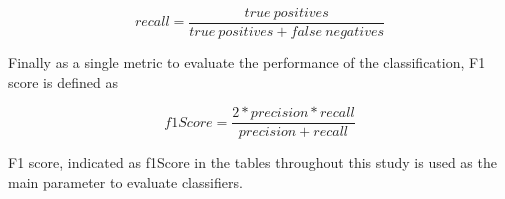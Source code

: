 \begin{equation}
recall = \frac{true \ positives}{true \ positives + false \ negatives}
\end{equation}

Finally as a single metric to evaluate the performance of the classification, F1 score is defined as

\begin{equation}
f1Score = \frac{2 * precision * recall}{precision + recall}
\end{equation}

F1 score, indicated as f1Score in the tables throughout this study is used as the main parameter to evaluate classifiers.

